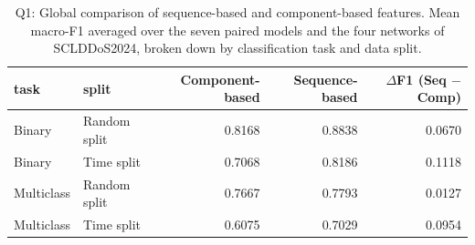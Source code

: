 \begin{table}
\caption{Q1: Global comparison of sequence-based and component-based features. Mean macro-F1 averaged over the seven paired models and the four networks of SCLDDoS2024, broken down by classification task and data split.}
\label{tab:q1_overall}
\begin{tabular}{llrrr}
\toprule
task & split & Component-based & Sequence-based & $\Delta$F1 (Seq $-$ Comp) \\
\midrule
Binary & Random split & 0.8168 & 0.8838 & 0.0670 \\
Binary & Time split & 0.7068 & 0.8186 & 0.1118 \\
Multiclass & Random split & 0.7667 & 0.7793 & 0.0127 \\
Multiclass & Time split & 0.6075 & 0.7029 & 0.0954 \\
\bottomrule
\end{tabular}
\end{table}
